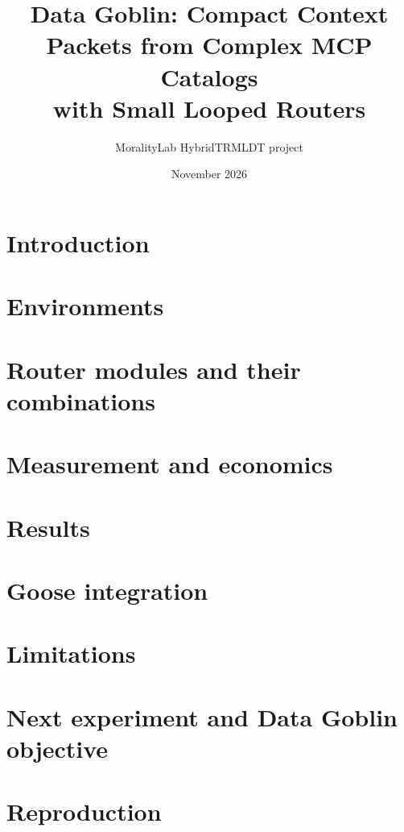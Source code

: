 \documentclass[11pt]{article}
\title{Data Goblin: Compact Context Packets from Complex MCP Catalogs\\with Small Looped Routers}
\author{MoralityLab HybridTRMLDT project}
\date{November 2026}
\begin{document}
\maketitle

\begin{abstract}

\end{abstract}

\section{Introduction}


\section{Environments}


\section{Router modules and their combinations}


\section{Measurement and economics}


\section{Results}


\section{Goose integration}\label{sec:goose}


\section{Limitations}


\section{Next experiment and Data Goblin objective}\label{sec:next}


\appendix
\section{Reproduction}

\end{document}
